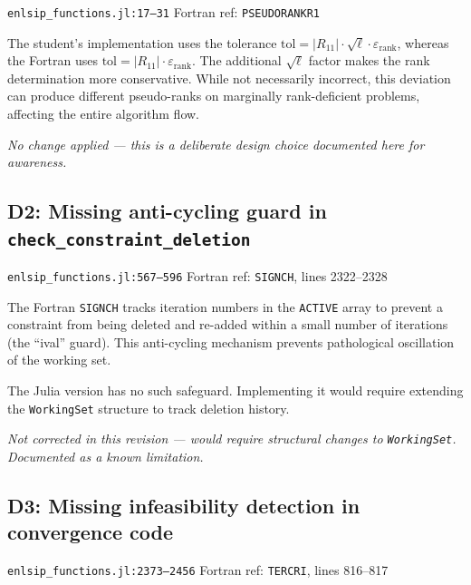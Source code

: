 \documentclass[11pt, a4paper]{article}
\newcommand{\fortranref}[1]{\texttt{#1}}
\newcommand{\juliaref}[2]{\texttt{#1:#2}}
\begin{document}
\juliaref{enlsip\_functions.jl}{17--31}
\quad Fortran ref: \fortranref{PSEUDORANKR1}

The student's implementation uses the tolerance
$\mathrm{tol} = |R_{11}| \cdot \sqrt{\ell} \cdot \varepsilon_{\mathrm{rank}}$,
whereas the Fortran uses $\mathrm{tol} = |R_{11}| \cdot \varepsilon_{\mathrm{rank}}$.
The additional $\sqrt{\ell}$ factor makes the rank determination more
conservative.  While not necessarily incorrect, this deviation can
produce different pseudo-ranks on marginally rank-deficient problems,
affecting the entire algorithm flow.

\medskip\noindent
\textit{No change applied --- this is a deliberate design choice documented here
for awareness.}

\subsection{D2: Missing anti-cycling guard in \texttt{check\_constraint\_deletion}}
\label{sec:d2}

\juliaref{enlsip\_functions.jl}{567--596}
\quad Fortran ref: \fortranref{SIGNCH}, lines 2322--2328

The Fortran \fortranref{SIGNCH} tracks iteration numbers in the
\texttt{ACTIVE} array to prevent a constraint from being deleted and
re-added within a small number of iterations (the ``ival'' guard).
This anti-cycling mechanism prevents pathological oscillation of the
working set.

The Julia version has no such safeguard.  Implementing it would require
extending the \texttt{WorkingSet} structure to track deletion history.

\medskip\noindent
\textit{Not corrected in this revision --- would require structural changes to
\texttt{WorkingSet}.  Documented as a known limitation.}

\subsection{D3: Missing infeasibility detection in convergence code}
\label{sec:d3}

\juliaref{enlsip\_functions.jl}{2373--2456}
\quad Fortran ref: \fortranref{TERCRI}, lines 816--817
\end{document}
